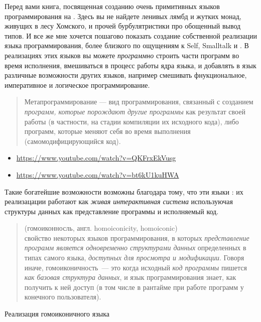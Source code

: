 \secdown

Перед вами книга, посвященная созданию очень примитивных языков программирования
на \py. Здесь вы не найдете ленивых лямбд и жутких монад, живущих в лесу
Хомского, и прочей бурбулятристики про обощенный вывод типов.
И все же мне хочется пошагово показать создание собственной реализации языка
программирования, более близкого по ощущениям к Self, Smalltalk и \lisp.
В реализациях этих языков вы можете \emph{программно} строить части программ во
время исполнения, вмешиваться в процесс работы ядра языка, и добавлять в язык
различные возможности других языков, например смешивать фнукциональное,
императивное и логическое программирование.

\begin{quotation}\noindent
Метапрограммирование — вид программирования, связанный с созданием
\textit{программ, которые порождают другие программы} как результат своей работы
(в частности, на стадии компиляции их исходного кода), либо программ, которые
меняют себя во время выполнения (самомодифицирующийся код).
\end{quotation}

\begin{itemize}
  \item 
\url{https://www.youtube.com/watch?v=QKFrxEkVusg}
  \item 
\url{https://www.youtube.com/watch?v=bt6kU1kuHWA}
\end{itemize}

Такие богатейшие возможности  возможны благодара
тому, что эти языки : их реализацации работают как
\emph{живая интерактивная система} используючая структуры данных как
представление программы и исполняемый код.

\begin{quotation}\noindent
{} (гомоиконносль, англ. homoiconicity, homoiconic)\\
свойство некоторых языков программирования, в которых \emph{представление
программ является одновременно структурами данных} определенных в типах самого
языка, \emph{доступных для просмотра и модификации}. Говоря иначе,
гомоиконичность\ --- это когда исходный \textit{код программы} пишется
\textit{как базовая структура данных}, и язык программирования знает, как
получить к ней доступ (в том числе в рантайме при работе программ у конечного
пользователя).
\end{quotation}

Реализация  гомоиконичного языка 


